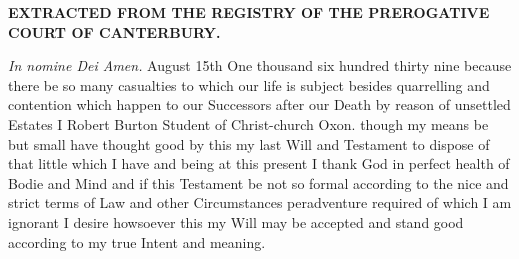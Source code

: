\begin{displayquote}
{\scriptsize{}
\textbf{EXTRACTED FROM THE REGISTRY OF THE PREROGATIVE COURT OF CANTERBURY.}

\emph{In nomine Dei Amen.} August 15th One thousand six hundred thirty nine because there be so many casualties to which our life is subject besides quarrelling and contention which happen to our Successors after our Death by reason of unsettled Estates I Robert Burton Student of Christ-church Oxon. though my means be but small have thought good by this my last Will and Testament to dispose of that little which I have and being at this present I thank God in perfect health of Bodie and Mind and if this Testament be not so formal according to the nice and strict terms of Law and other Circumstances peradventure required of which I am ignorant I desire howsoever this my Will may be accepted and stand good according to my true Intent and meaning.

}
\end{displayquote}
